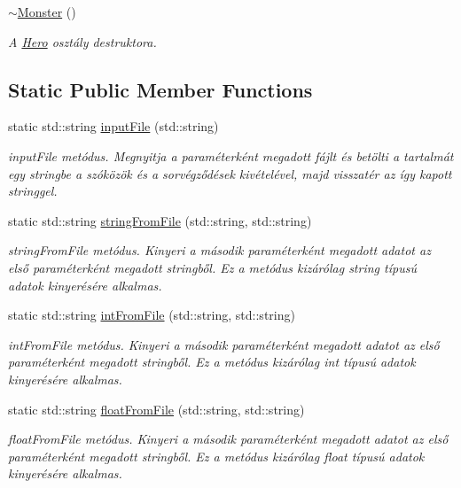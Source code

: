 \begin{DoxyCompactItemize}
\mbox{\label{classMonster_a21619ba1759b910cd2fd50d858aab338}} 
\hyperlink{classMonster_a21619ba1759b910cd2fd50d858aab338}{$\sim$\+Monster} ()
\begin{DoxyCompactList}\small\item\em A \hyperlink{classHero}{Hero} osztály destruktora. \end{DoxyCompactList}\end{DoxyCompactItemize}
\subsection*{Static Public Member Functions}
\begin{DoxyCompactItemize}
\item 
static std\+::string \hyperlink{classMonster_a90bfb1667b86f8cfd27224f9fd9f5648}{input\+File} (std\+::string)
\begin{DoxyCompactList}\small\item\em input\+File metódus. Megnyitja a paraméterként megadott fájlt és betölti a tartalmát egy stringbe a szóközök és a sorvégződések kivételével, majd visszatér az így kapott stringgel. \end{DoxyCompactList}\item 
static std\+::string \hyperlink{classMonster_a3f4024974e75839d41066bbb41488d3b}{string\+From\+File} (std\+::string, std\+::string)
\begin{DoxyCompactList}\small\item\em string\+From\+File metódus. Kinyeri a második paraméterként megadott adatot az első paraméterként megadott stringből. Ez a metódus kizárólag string típusú adatok kinyerésére alkalmas. \end{DoxyCompactList}\item 
static std\+::string \hyperlink{classMonster_ab9867cf57f44071370b410400e1c234f}{int\+From\+File} (std\+::string, std\+::string)
\begin{DoxyCompactList}\small\item\em int\+From\+File metódus. Kinyeri a második paraméterként megadott adatot az első paraméterként megadott stringből. Ez a metódus kizárólag int típusú adatok kinyerésére alkalmas. \end{DoxyCompactList}\item 
static std\+::string \hyperlink{classMonster_a7baee0c1c76674c30d601e2db8af2c7e}{float\+From\+File} (std\+::string, std\+::string)
\begin{DoxyCompactList}\small\item\em float\+From\+File metódus. Kinyeri a második paraméterként megadott adatot az első paraméterként megadott stringből. Ez a metódus kizárólag float típusú adatok kinyerésére alkalmas. \end{DoxyCompactList}\item 

\end{DoxyCompactItemize}
